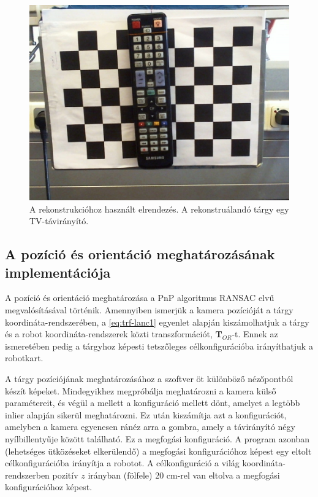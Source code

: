 \begin{figure}[H]
\centering
\includegraphics[width=\linewidth]{chapters/implementation/3dreconstr.jpg}
\caption{A rekonstrukcióhoz használt elrendezés. A rekonstruálandó tárgy egy TV-távirányító.}
\label{fig:reconstr-img}
\end{figure}

\subsection{A pozíció és orientáció meghatározásának implementációja}

A pozíció és orientáció meghatározása a PnP algoritmus RANSAC elvű megvalósításával történik. Amennyiben ismerjük a kamera pozícióját a tárgy koordináta-rendszerében, a \eqref{eq:trf-lanc1} egyenlet alapján kiszámolhatjuk a tárgy és a robot koordináta-rendszerek közti transzformációt, $\mathbf{T}_{OR}$-t. Ennek az ismeretében pedig a tárgyhoz képesti tetszőleges célkonfigurációba irányíthatjuk a robotkart.

A tárgy pozíciójának meghatározásához a szoftver öt különböző nézőpontból készít képeket. Mindegyikhez megpróbálja meghatározni a kamera külső paramétereit, és végül a mellett a konfiguráció mellett dönt, amelyet a legtöbb inlier alapján sikerül meghatározni. Ez után kiszámítja azt a konfigurációt, amelyben a kamera egyenesen ránéz arra a gombra, amely a távirányító négy nyílbillentyűje között található. Ez a megfogási konfiguráció. A program azonban (lehetséges ütközéseket elkerülendő) a megfogási konfigurációhoz képest egy eltolt célkonfigurációba irányítja a robotot. A célkonfiguráció a világ koordináta-rendszerben pozitív $z$ irányban (fölfele) 20 cm-rel van eltolva a megfogási konfigurációhoz képest.

